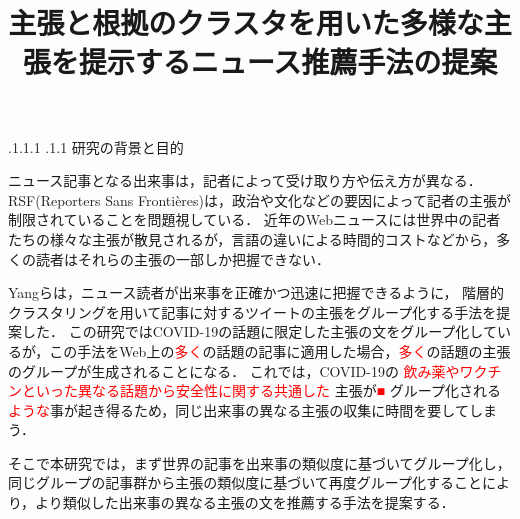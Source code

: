\documentclass[a4paper, twocolumn, 10pt]{jarticle}
\makeatletter
\def\section{%
	\@startsection{section}{1}{\z@}%
	{.1\Cvs \@plus.1\Cdp \@minus.1\Cdp}%
	{.1\Cvs \@plus.1\Cdp}%
	{\normalfont\normalsize\bfseries}%
}
\makeatother
\begin{document}
\title{主張と根拠のクラスタを用いた多様な主張を提示するニュース推薦手法の提案}

\maketitle

\thispagestyle{empty}

\section{研究の背景と目的}

ニュース記事となる出来事は，記者によって受け取り方や伝え方が異なる．
RSF(Reporters Sans Frontières)は，政治や文化などの要因によって記者の主張が制限されていることを問題視している\cite{2021_world_press_freedom_index}．
近年のWebニュースには世界中の記者たちの様々な主張が散見されるが，言語の違いによる時間的コストなどから，多くの読者はそれらの主張の一部しか把握できない．

Yangらは，ニュース読者が出来事を正確かつ迅速に把握できるように，
階層的クラスタリングを用いて記事に対するツイートの主張をグループ化する手法を提案した\cite{yang_scalable_2021}．
この研究ではCOVID-19の話題に限定した主張の文をグループ化しているが，この手法をWeb上の\textcolor{red}{多く}の話題の記事に適用した場合，\textcolor{red}{多く}の話題の主張のグループが生成されることになる．
これでは，COVID-19の
\textcolor{red}{飲み薬やワクチンといった異なる話題から安全性に関する共通した}
主張が\textcolor{red}{■}
グループ化される\textcolor{red}{ような}事が起き得るため，同じ出来事の異なる主張の収集に時間を要してしまう．






そこで本研究では，まず世界の記事を出来事の類似度に基づいてグループ化し，同じグループの記事群から主張の類似度に基づいて再度グループ化することにより，より類似した出来事の異なる主張の文を推薦する手法を提案する．
\end{document}
